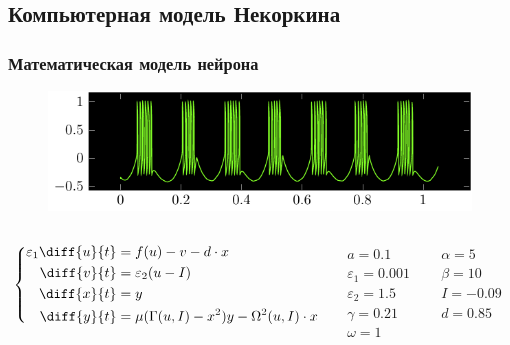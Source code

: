\subsection{Компьютерная модель Некоркина}
\begin{frame}%
	\frametitle{Математическая модель нейрона}
		\vspace{-2em}
	\begin{figure}[h]
		\hspace{-2em}
		\includegraphics[]{img/berst_matlab}
	\end{figure}
	
	\begin{columns}[t]
		\begin{column}{0.60\textwidth}
			\vspace{-3em}
			\begin{equation*}
				\left\{
				\begin{aligned}
					\varepsilon_1\diff{u}{t} & =f(u)-v-d\cdot x\\
					\diff{v}{t} & =\varepsilon_2(u-I)\\
					\diff{x}{t} & =y\\
					\diff{y}{t} & =\mu(\Gamma(u,I)-x^2)y-\Omega^2(u,I)\cdot x
				\end{aligned}
				\right.
			\end{equation*}
		\end{column}
		\begin{column}{0.2\textwidth}
			$a=0.1$\\
			$\varepsilon_1=0.001$\\
			$\varepsilon_2=1.5$\\
			$\gamma=0.21$\\
			$\omega=1$\\
		\end{column}
		\begin{column}{0.19\textwidth}
			$\alpha=5$\\
			$\beta=10$\\
			$I=-0.09$\\
			$d=0.85$\\
		\end{column}		
	\end{columns}
\end{frame}
